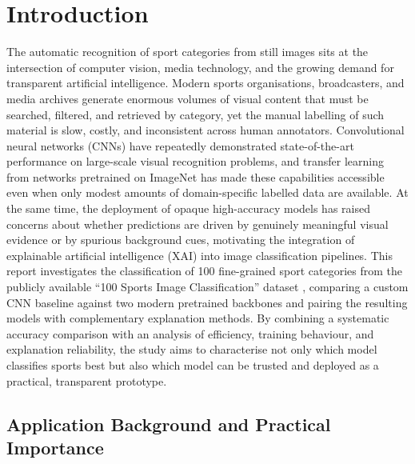 \section{Introduction}
\label{sec:introduction}

The automatic recognition of sport categories from still images sits at the intersection of computer vision, media technology, and the growing demand for transparent artificial intelligence.
Modern sports organisations, broadcasters, and media archives generate enormous volumes of visual content that must be searched, filtered, and retrieved by category, yet the manual labelling of such material is slow, costly, and inconsistent across human annotators.
Convolutional neural networks (CNNs) have repeatedly demonstrated state-of-the-art performance on large-scale visual recognition problems, and transfer learning from networks pretrained on ImageNet has made these capabilities accessible even when only modest amounts of domain-specific labelled data are available.
At the same time, the deployment of opaque high-accuracy models has raised concerns about whether predictions are driven by genuinely meaningful visual evidence or by spurious background cues, motivating the integration of explainable artificial intelligence (XAI) into image classification pipelines.
This report investigates the classification of 100 fine-grained sport categories from the publicly available ``100 Sports Image Classification'' dataset \citep{piosenka2022sports}, comparing a custom CNN baseline against two modern pretrained backbones and pairing the resulting models with complementary explanation methods.
By combining a systematic accuracy comparison with an analysis of efficiency, training behaviour, and explanation reliability, the study aims to characterise not only which model classifies sports best but also which model can be trusted and deployed as a practical, transparent prototype.

\subsection{Application Background and Practical Importance}
\label{sec:intro-application}

